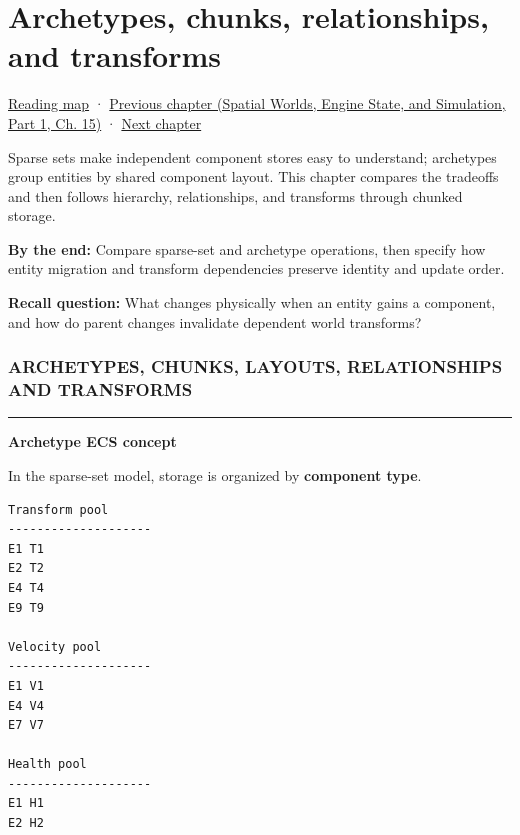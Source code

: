 \chapter{Archetypes, chunks, relationships, and transforms}\label{05-engine-i-ch016-archetypes-chunks-relationships-and-transforms}\hypertarget{05-engine-i-ch016}{}\label{stagechapter:05-engine-i-ch016}

\hypertarget{05-engine-i-ch016-archetypes-chunks-relationships-and-transforms}{}

\hyperref[volume-reading-map]{Reading map} · \href{../05-Spatial-Worlds-Engine-State-and-Simulation-P01/main.pdf\#nameddest=05-engine-i-ch015-sparse-set-components-and-generational-entity-handles}{Previous chapter (Spatial Worlds, Engine State, and Simulation, Part 1, Ch. 15)} · \hyperref[05-engine-i-ch017-ecs-performance-through-cache-and-scheduling]{Next chapter}

Sparse sets make independent component stores easy to understand; archetypes group entities by shared component layout. This chapter compares the tradeoffs and then follows hierarchy, relationships, and transforms through chunked storage.

\textbf{By the end:} Compare sparse-set and archetype operations, then specify how entity migration and transform dependencies preserve identity and update order.

\textbf{Recall question:} What changes physically when an entity gains a component, and how do parent changes invalidate dependent world transforms?

\subsection{ARCHETYPES, CHUNKS, LAYOUTS, RELATIONSHIPS AND TRANSFORMS}\label{05-engine-i-ch016-archetypes-chunks-layouts-relationships-and-transforms}

\hypertarget{05-engine-i-ch016-archetypes-chunks-layouts-relationships-and-transforms}{}

\begin{center}\rule{0.5\linewidth}{0.5pt}\end{center}

\textbf{Archetype ECS concept}

In the sparse-set model, storage is organized by \textbf{component type}.

\begin{verbatim}
Transform pool
--------------------
E1 T1
E2 T2
E4 T4
E9 T9

Velocity pool
--------------------
E1 V1
E4 V4
E7 V7

Health pool
--------------------
E1 H1
E2 H2
\end{verbatim}

